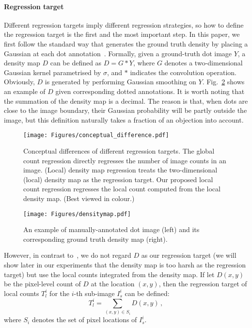 \documentclass[twocolumn]{bmcart}%
\begin{document}
\paragraph{Regression target}

Different regression targets imply different regression strategies, so how to define the regression target is the first and the most important step. In this paper, we first follow the standard way that generates the ground truth density by placing a Gaussian at each dot annotation~\cite{vlaz2010denlearn}. Formally, given a ground-truth dot image $Y$, a density map $D$ can be defined as $D=G*Y$, where $G$ denotes a two-dimensional Gaussian kernel parametrised by $\sigma$, and $*$ indicates the convolution operation. Obviously, $D$ is generated by performing Gaussian smoothing on $Y$. Fig.~\ref{fig:densitymap} shows an example of $D$ given corresponding dotted annotations. It is worth noting that the summation of the density map is a decimal. The reason is that, when dots are close to the image boundary, their Gaussian probability will be partly outside the image, but this definition naturally takes a fraction of an objection into account.

\begin{figure}[h!]
	\centering
	\texttt{[image: Figures/conceptual\_difference.pdf]}
	\caption[width=\textwidth]{Conceptual differences of different regression targets. The global count regression directly regresses the number of image counts in an image. (Local) density map regression treats the two-dimensional (local) density map as the regression target. Our proposed local count regression regresses the local count computed from the local density map. (Best viewed in colour.)}
	\label{fig:reg_diff}
\end{figure}

\begin{figure}[!t]
	\texttt{[image: Figures/densitymap.pdf]}
	\caption{An example of manually-annotated dot image (left) and its corresponding ground truth density map (right).}
	\label{fig:densitymap}
\end{figure}

However, in contrast to~\cite{vlaz2010denlearn,onoro2016towards}, we do not regard $D$ as our regression target (we will show later in our experiments that the density map is too harsh as the regression target) but use the local counts integrated from the density map. If let $D(x,y)$ be the pixel-level count of $D$ at the location $(x,y)$, then the regression target of local counts $T_l^i$ for the $i$-th sub-image $I_s^i$ can be defined:
\begin{equation}
T_l^i=\sum_{(x,y)\in S_i}D(x,y)\,,
\end{equation}
where $S_i$ denotes the set of pixel locations of $I_s^i$.
\end{document}
